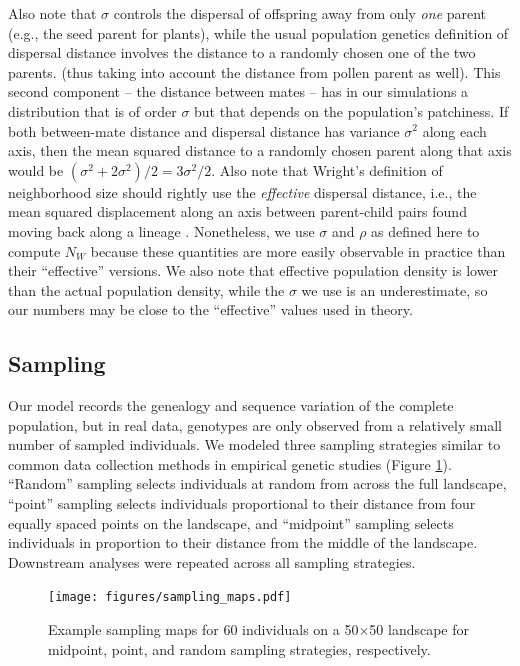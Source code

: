 \documentclass[10pt,twoside,lineno,hidelinks]{preprint}
\begin{document}
Also note that $\sigma$ controls the dispersal of offspring away from only \emph{one} parent 
(e.g., the seed parent for plants),
while the usual population genetics definition of dispersal distance
involves the distance to a randomly chosen one of the two parents.
(thus taking into account the distance from pollen parent as well).
This second component -- the distance between mates --
has in our simulations a distribution that is of order $\sigma$ but that depends on the population's patchiness.
If both between-mate distance and dispersal distance has variance $\sigma^2$ along each axis,
then the mean squared distance to a randomly chosen parent along that axis would be
$(\sigma^2 + 2 \sigma^2)/2 = 3 \sigma^2 /2$.
Also note that Wright's definition of neighborhood size should rightly use the \emph{effective}
dispersal distance, i.e., the mean squared displacement along an axis
between parent-child pairs found moving back along a lineage \citep{barton2002neutral}.
Nonetheless, we use $\sigma$ and $\rho$ as defined here to compute $N_W$
because these quantities are more easily observable in practice than their ``effective'' versions.
We also note that effective population density is lower than the actual population density,
while the $\sigma$ we use is an underestimate,
so our numbers may be close to the ``effective'' values used in theory.


\subsection{Sampling}
Our model records the genealogy and sequence variation of the complete population, but in real data, genotypes are only observed from a relatively small number of sampled individuals. We modeled three sampling strategies similar to common data collection methods in empirical genetic studies (Figure \ref{fig:samplemap}). ``Random'' sampling selects individuals at random from across the full landscape, ``point'' sampling selects individuals proportional to their distance from four equally spaced points on the landscape, and ``midpoint'' sampling selects individuals in proportion to their distance from the middle of the landscape. Downstream analyses were repeated across all sampling strategies. 


\begin{figure}[htbp]
\centering
\texttt{[image: figures/sampling\_maps.pdf]}
\caption{Example sampling maps for 60 individuals on a 50$\times$50 landscape for midpoint, point, and random sampling strategies, respectively.}
\label{fig:samplemap}
\end{figure}
\end{document}
